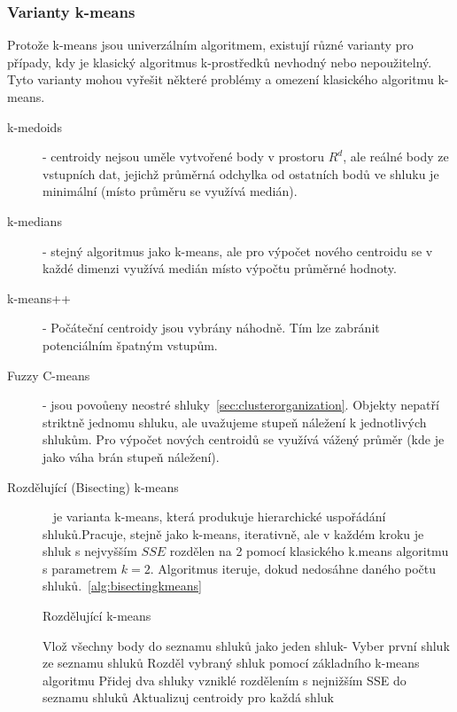 \subsubsection{Varianty k-means}
Protože k-means jsou univerzálním algoritmem, existují různé varianty pro případy, kdy je klasický algoritmus k-prostředků nevhodný nebo nepoužitelný. Tyto varianty mohou vyřešit některé problémy a omezení klasického algoritmu k-means.
\begin{description}
\item[k-medoids] - centroidy nejsou uměle vytvořené body v prostoru $R^d$, ale reálné body ze vstupních dat, jejichž průměrná odchylka od ostatních bodů ve shluku je minimální (místo průměru se využívá medián).
\item[k-medians] - stejný algoritmus jako k-means, ale pro výpočet nového centroidu se v každé dimenzi využívá medián místo výpočtu průměrné hodnoty.
\item[k-means++] - Počáteční centroidy jsou vybrány náhodně. Tím lze zabránit potenciálním špatným vstupům.
\item[Fuzzy C-means] - jsou povoůeny neostré shluky~\ref{sec:clusterorganization}. Objekty nepatří striktně jednomu shluku, ale uvažujeme stupeň náležení k jednotlivých shlukům. Pro výpočet nových centroidů se využívá vážený průměr (kde je jako váha brán stupeň náležení).
\item[Rozdělující (Bisecting) k-means]~\cite{Tan05} je varianta k-means, která produkuje hierarchické uspořádání shluků.Pracuje, stejně jako k-means, iterativně, ale v každém kroku je shluk s nejvyšším $SSE$ rozdělen na 2 pomocí klasického k.means algoritmu s parametrem $k=2$. Algoritmus iteruje, dokud nedosáhne daného počtu shluků.~\autoref{alg:bisectingkmeans}
\begin{algorithm}
\caption{Rozdělující k-means}\label{alg:bisectingkmeans}
\begin{algorithmic}[1]
\State Vlož všechny body do seznamu shluků jako jeden shluk-
\Repeat
\State Vyber první shluk ze seznamu shluků
\State Rozděl vybraný shluk pomocí základního k-means algoritmu
\EndFor
\State Přidej dva shluky vzniklé rozdělením s nejnižším SSE do seznamu shluků
\State Aktualizuj centroidy pro každá shluk
\end{algorithmic}
\end{algorithm}

\end{description}
